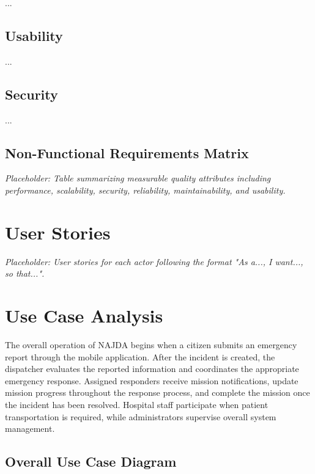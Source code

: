 ...

\subsection{Usability}

...

\subsection{Security}

...

\subsection{Non-Functional Requirements Matrix}

\textit{Placeholder: Table summarizing measurable quality attributes including performance, scalability, security, reliability, maintainability, and usability.}


\section{User Stories}

\textit{Placeholder: User stories for each actor following the format "As a..., I want..., so that...".}


\section{Use Case Analysis}

The overall operation of NAJDA begins when a citizen submits an emergency report through the mobile application. After the incident is created, the dispatcher evaluates the reported information and coordinates the appropriate emergency response. Assigned responders receive mission notifications, update mission progress throughout the response process, and complete the mission once the incident has been resolved. Hospital staff participate when patient transportation is required, while administrators supervise overall system management.

\subsection{Overall Use Case Diagram}

